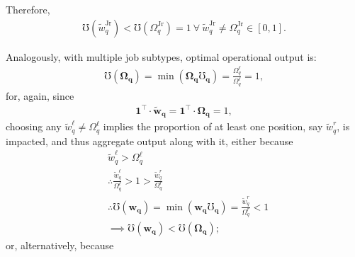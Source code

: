 \documentclass[hidelinks, nonatbib]{elsarticle}
\begin{document}
\begin{enumerate}
    Therefore, 
    \begin{gather}
        \mho(\tilde{w}_{q}^{\text{Jr}}) < 
        \mho(\Omega_{q}^{\text{Jr}}) 
        = 1
        \
        \forall
        \
        \tilde{w}_{q}^{\text{Jr}}
        \neq
        \Omega_{q}^{\text{Jr}}
        \in [0,1]
        .
    \end{gather}

    Analogously, with multiple job subtypes, optimal operational output is:
    \begin{gather}
        \mho(\boldsymbol{\Omega_q})
        = 
        \min(
            \boldsymbol{\Omega_q}
            \boldsymbol{\mho_q}
        )
        =
        \frac{
            \Omega_{q}^{\ell}
        }{
            \Omega_{q}^{\ell}
        }
        =
        1
        ,
    \end{gather}
    for, again, since
    \begin{gather}
        \boldsymbol{1} ^ {\top}
        \cdot
        \boldsymbol{\tilde{w}_{q}}
        =
        \boldsymbol{1} ^ {\top}
        \cdot
        \boldsymbol{\Omega_{q}}
        = 1
        ,
    \end{gather}
    choosing any $\tilde{w}_{q}^{\ell} \neq \Omega_{q}^{\ell}$ implies the proportion of at least one position, say $\tilde{w}_{q}^{r}$, is impacted, and thus aggregate output along with it, either because
    \begin{align}
        &
        \tilde{w}_{q}^{\ell} > \Omega_{q}^{\ell}
        \\
        &\therefore
        \frac{
            \tilde{w}_{q}^{\ell}
        }{
            \Omega_{q}^{\ell}
        }
        > 
        1
        > 
        \frac{
            \tilde{w}_{q}^{r}
        }{
            \Omega_{q}^{r}
        }
        \\
        &\therefore
        \mho(\boldsymbol{w_q})
        = 
        \min(
            \boldsymbol{w_q}
            \boldsymbol{\mho_q}
        )
        =
        \frac{
            \tilde{w}_{q}^{r}
        }{
            \Omega_{q}^{r}
        }
        < 
        1
        \\
        &\implies
        \mho(\boldsymbol{w_q})
        <
        \mho(\boldsymbol{\Omega_q})
        ;
    \end{align}
    or, alternatively, because

\end{enumerate}
\end{document}
